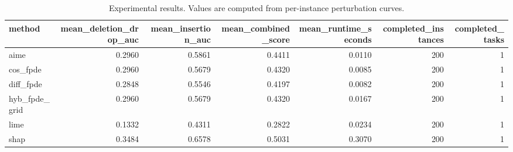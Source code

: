 \begin{table}[t]
\caption{Experimental results. Values are computed from per-instance perturbation curves.}
\label{tab:main_results_computed}
\centering
\begin{tabular}{lrrrrrr}
\toprule
method & mean\_deletion\_drop\_auc & mean\_insertion\_auc & mean\_combined\_score & mean\_runtime\_seconds & completed\_instances & completed\_tasks \\
\midrule
aime & 0.2960 & 0.5861 & 0.4411 & 0.0110 & 200 & 1 \\
cos\_fpde & 0.2960 & 0.5679 & 0.4320 & 0.0085 & 200 & 1 \\
diff\_fpde & 0.2848 & 0.5546 & 0.4197 & 0.0082 & 200 & 1 \\
hyb\_fpde\_grid & 0.2960 & 0.5679 & 0.4320 & 0.0167 & 200 & 1 \\
lime & 0.1332 & 0.4311 & 0.2822 & 0.0234 & 200 & 1 \\
shap & 0.3484 & 0.6578 & 0.5031 & 0.3070 & 200 & 1 \\
\bottomrule
\end{tabular}

\end{table}
